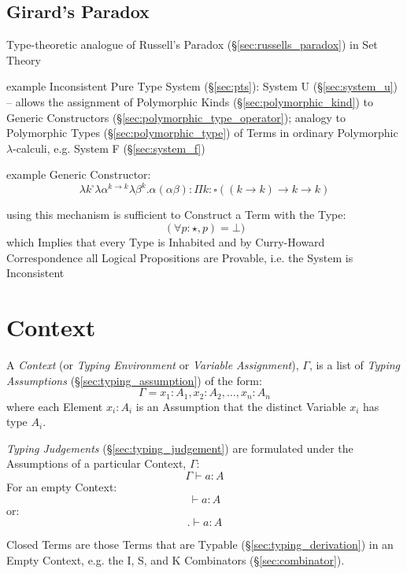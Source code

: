 \subsection{Girard's Paradox}\label{sec:girards_paradox}

Type-theoretic analogue of Russell's Paradox
(\S\ref{sec:russells_paradox}) in Set Theory

example Inconsistent Pure Type System (\S\ref{sec:pts}): System U
(\S\ref{sec:system_u}) -- allows the assignment of Polymorphic Kinds
(\S\ref{sec:polymorphic_kind}) to Generic Constructors
(\S\ref{sec:polymorphic_type_operator}); analogy to Polymorphic Types
(\S\ref{sec:polymorphic_type}) of Terms in ordinary Polymorphic
$\lambda$-calculi, e.g. System F (\S\ref{sec:system_f})

example Generic Constructor:
\[
  \lambda k^\square \lambda \alpha^{k \rightarrow k}\lambda\beta^k.
    \alpha(\alpha\beta) :
  \Pi k:\square((k \rightarrow k) \rightarrow k \rightarrow k)
\]

using this mechanism is sufficient to Construct a Term with the Type:
\[
  (\forall p:\star,p) = \bot)
\]
which Implies that every Type is Inhabited and by Curry-Howard
Correspondence all Logical Propositions are Provable, i.e. the System
is Inconsistent



\section{Context}\label{sec:type_context}

A \emph{Context} (or \emph{Typing Environment} or \emph{Variable
  Assignment}), $\Gamma$, is a list of \emph{Typing Assumptions}
(\S\ref{sec:typing_assumption}) of the form:
\[
  \Gamma = x_1 : A_1, x_2 : A_2, \ldots, x_n : A_n
\]
where each Element $x_i : A_i$ is an Assumption that the distinct
Variable $x_i$ has type $A_i$.

\emph{Typing Judgements} (\S\ref{sec:typing_judgement}) are formulated
under the Assumptions of a particular Context, $\Gamma$:
\[
  \Gamma \vdash a : A
\]
For an empty Context:
\[
  \vdash a : A
\]
or:
\[
  . \vdash a : A
\]

Closed Terms are those Terms that are Typable
(\S\ref{sec:typing_derivation}) in an Empty Context, e.g. the I, S,
and K Combinators (\S\ref{sec:combinator}).

